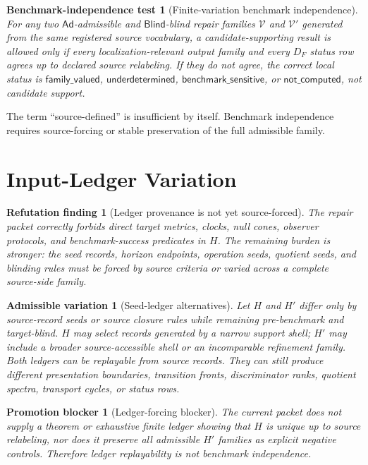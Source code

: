 \documentclass[11pt]{article}
\newcommand{\Ad}{\mathsf{Ad}}
\newcommand{\Blind}{\mathsf{Blind}}
\newtheorem{test}{Benchmark-independence test}
\newtheorem{finding}{Refutation finding}
\newtheorem{variation}{Admissible variation}
\newtheorem{blocker}{Promotion blocker}
\begin{document}
\begin{test}[Finite-variation benchmark independence]
For any two \(\Ad\)-admissible and \(\Blind\)-blind repair families
\(\mathcal{V}\) and \(\mathcal{V}'\) generated from the same registered
source vocabulary, a candidate-supporting result is allowed only if every
localization-relevant output family and every \(D_F\) status row agrees up
to declared source relabeling. If they do not agree, the correct local
status is \(\mathsf{family\_valued}\), \(\mathsf{underdetermined}\),
\(\mathsf{benchmark\_sensitive}\), or \(\mathsf{not\_computed}\), not
candidate support.
\end{test}

The term ``source-defined'' is insufficient by itself. Benchmark
independence requires source-forcing or stable preservation of the full
admissible family.

\section{Input-Ledger Variation}

\begin{finding}[Ledger provenance is not yet source-forced]
The repair packet correctly forbids direct target metrics, clocks, null
cones, observer protocols, and benchmark-success predicates in \(H\). The
remaining burden is stronger: the seed records, horizon endpoints, operation
seeds, quotient seeds, and blinding rules must be forced by source criteria
or varied across a complete source-side family.
\end{finding}

\begin{variation}[Seed-ledger alternatives]
Let \(H\) and \(H'\) differ only by source-record seeds or source closure
rules while remaining pre-benchmark and target-blind. \(H\) may select
records generated by a narrow support shell; \(H'\) may include a broader
source-accessible shell or an incomparable refinement family. Both ledgers
can be replayable from source records. They can still produce different
presentation boundaries, transition fronts, discriminator ranks, quotient
spectra, transport cycles, or status rows.
\end{variation}

\begin{blocker}[Ledger-forcing blocker]
The current packet does not supply a theorem or exhaustive finite ledger
showing that \(H\) is unique up to source relabeling, nor does it preserve
all admissible \(H'\) families as explicit negative controls. Therefore
ledger replayability is not benchmark independence.
\end{blocker}
\end{document}
